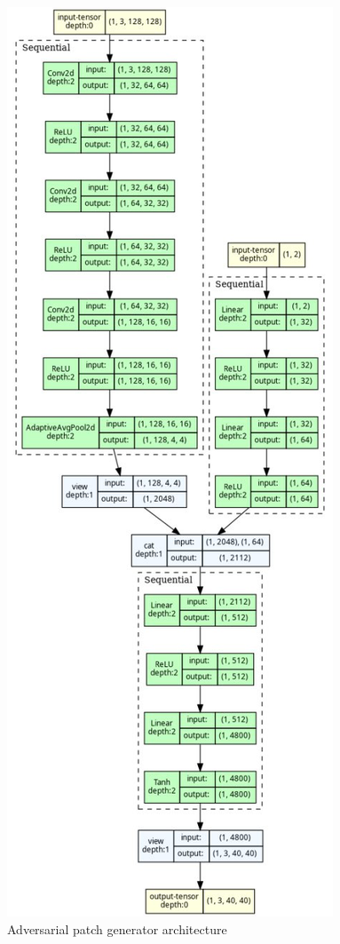 \begin{figure}[htbp]
    \centering
    \includegraphics[width=\linewidth,height=0.8\textheight,keepaspectratio]{figures/attacks_framework/patch_generator_graph.jpg}
    \caption{Adversarial patch generator architecture}
    \label{fig:patch_generator}
\end{figure}

